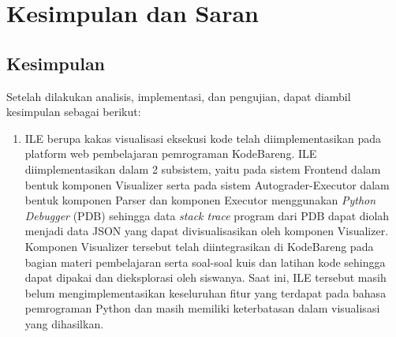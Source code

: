 \chapter{Kesimpulan dan Saran}


\section{Kesimpulan}
Setelah dilakukan analisis, implementasi, dan pengujian, dapat diambil kesimpulan sebagai berikut:
\begin{enumerate}
  \item ILE berupa kakas visualisasi eksekusi kode telah diimplementasikan pada platform web pembelajaran pemrograman KodeBareng. ILE diimplementasikan dalam 2 subsistem, yaitu pada sistem Frontend dalam bentuk komponen Visualizer serta pada sistem Autograder-Executor dalam bentuk komponen Parser dan komponen Executor menggunakan \textit{Python Debugger} (PDB) sehingga data \textit{stack trace} program dari PDB dapat diolah menjadi data JSON yang dapat divisualisasikan oleh komponen Visualizer. Komponen Visualizer tersebut telah diintegrasikan di KodeBareng pada bagian materi pembelajaran serta soal-soal kuis dan latihan kode sehingga dapat dipakai dan dieksplorasi oleh siswanya. Saat ini, ILE tersebut masih belum mengimplementasikan keseluruhan fitur yang terdapat pada bahasa pemrograman Python dan masih memiliki keterbatasan dalam visualisasi yang dihasilkan.

\end{enumerate}

